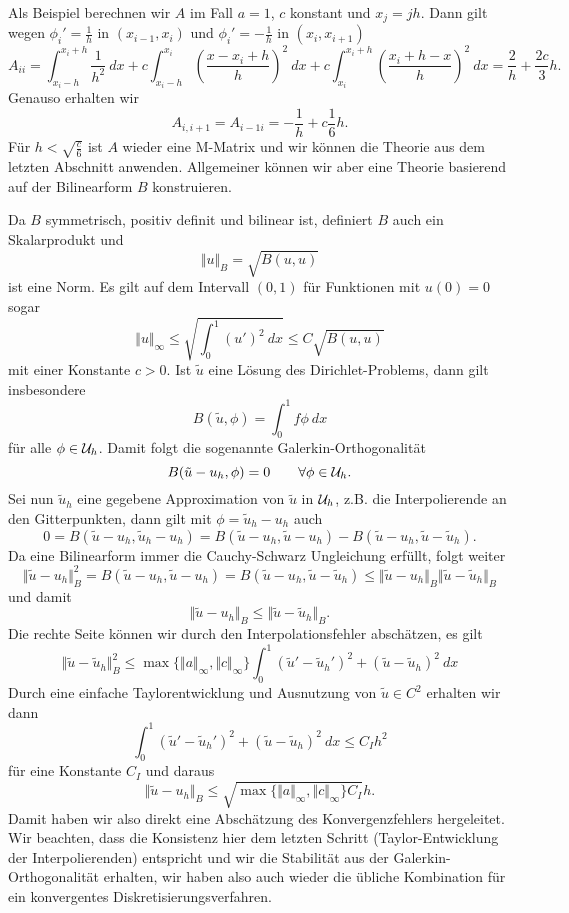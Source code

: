 \begin{example}{}{}
Als Beispiel berechnen wir $A$ im Fall $a=1$, $c$ konstant und $x_j = jh$. Dann gilt wegen $\phi_i'=\frac{1}h$ in $(x_{i-1},x_i)$ und $\phi_i'=-\frac{1}h$ in $(x_{i },x_{i+1})$
$$ A_{ii} = \int_{x_i-h}^{x_i+h} \frac{1}{h^2}~dx + c  \int_{x_i-h}^{x_i} \left( \frac{x-x_{i}+h}h \right)^2~dx
+ c  \int_{x_i}^{x_i+h} \left( \frac{x_{i}+h-x}h \right)^2~dx = \frac{2}h + \frac{2c}3 h. $$
Genauso erhalten wir 
$$ A_{i,i+1}=A_{i-1i} = - \frac{1}h + c \frac{1}6 h.$$
F\"ur $h < \sqrt{\frac{c}6}$ ist $A$ wieder eine M-Matrix und wir k\"onnen die Theorie aus dem letzten Abschnitt anwenden. Allgemeiner k\"onnen wir aber eine Theorie basierend auf der Bilinearform $B$ konstruieren. 
\end{example}

Da $B$ symmetrisch, positiv definit und bilinear ist, definiert $B$ auch ein Skalarprodukt und 
$$ \Vert u \Vert_B = \sqrt{B(u,u)} $$
ist eine Norm. Es gilt auf dem Intervall $(0,1)$ f\"ur Funktionen mit $u(0) = 0$ sogar 
$$ \Vert u\Vert_\infty \leq \sqrt{\int_0^1 (u')^2~dx} \leq C \sqrt{B(u,u)} $$
mit einer Konstante $c > 0$. Ist $\tilde u$ eine L\"osung des Dirichlet-Problems, dann gilt insbesondere
$$ B(\tilde u,\phi) = \int_0^1 f \phi ~dx
$$ f\"ur alle $\phi \in {\cal U}_h$. Damit folgt die sogenannte Galerkin-Orthogonalit\"at
$$ B(\tilde u - u_h, \phi) = 0 \qquad \forall \phi \in {\cal U}_h. $$
Sei nun $\tilde u_h$ eine gegebene Approximation von $\tilde u$ in ${\cal U}_h$, z.B. die Interpolierende an den Gitterpunkten, 
dann gilt mit $\phi = \tilde u_h - u_h$ auch 
$$ 0 = B(\tilde u - u_h,\tilde u_h - u_h) = B(\tilde u - u_h, \tilde u - u_h)  - B(\tilde u - u_h,\tilde u - \tilde u_h). $$
Da eine Bilinearform immer die Cauchy-Schwarz Ungleichung erf\"ullt, folgt weiter
$$ \Vert \tilde u - u_h \Vert_B^2 =  B(\tilde u - u_h, \tilde u - u_h)=  B(\tilde u - u_h,\tilde u - \tilde u_h) 
\leq \Vert \tilde u - u_h \Vert_B \Vert \tilde u - \tilde u_h \Vert_B $$
und damit 
$$ \Vert \tilde u - u_h \Vert_B \leq \Vert \tilde u - \tilde u_h \Vert_B. $$ 
Die rechte Seite k\"onnen wir durch den Interpolationsfehler absch\"atzen, es gilt 
$$\Vert\tilde u - \tilde u_h \Vert_B^2 \leq \max\{\Vert a\Vert_\infty, \Vert c \Vert_\infty\} \int_0^1 ( \tilde u' - \tilde u_h')^2 + 
 ( \tilde u - \tilde u_h)^2~dx $$
Durch eine einfache Taylorentwicklung und Ausnutzung von $\tilde u \in C^2$ erhalten wir dann 
$$  \int_0^1 ( \tilde u' - \tilde u_h')^2 + 
 ( \tilde u - \tilde u_h)^2~dx \leq C_I h^2 $$
f\"ur eine Konstante $C_I$ und daraus 
$$ \Vert \tilde u - u_h \Vert_B  \leq \sqrt{\max\{\Vert a\Vert_\infty, \Vert c \Vert_\infty\} C_I} h. $$
Damit haben wir also direkt eine Absch\"atzung des Konvergenzfehlers hergeleitet. Wir beachten, dass die Konsistenz hier dem letzten Schritt (Taylor-Entwicklung der Interpolierenden) entspricht und wir die Stabilit\"at aus der Galerkin-Orthogonalit\"at erhalten, wir haben also auch wieder die \"ubliche Kombination f\"ur ein konvergentes Diskretisierungsverfahren.